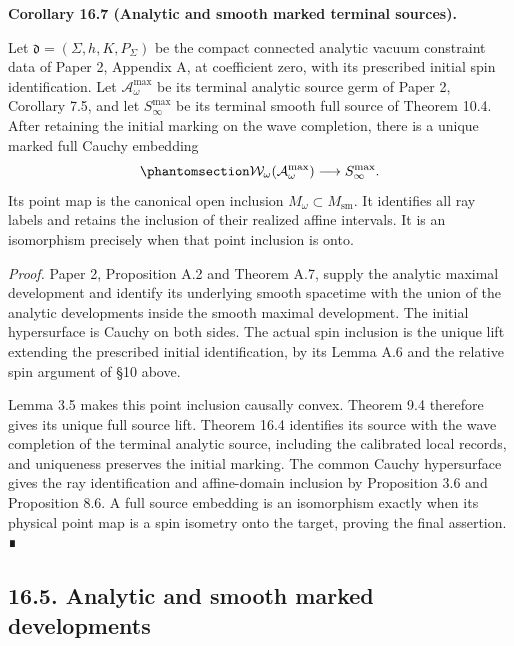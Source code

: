 \documentclass[
  english,
  11pt,
  reqno]{amsart}
\makeatletter
\newcommand{\pandocstatementheading}[1]{%
  \par\if@nobreak\else
    \addpenalty{\@beginparpenalty}%
    \addvspace{.5\baselineskip plus .2\baselineskip minus .2\baselineskip}%
  \fi
  {\normalfont\bfseries #1\par}%
  \nobreak\@afterindenttrue\@afterheading
}
\makeatother
\begin{document}
\pandocstatementheading{\protect{}\label{cor:analytic-smooth-terminal-source-inclusion}Corollary 16.7 (Analytic and smooth marked terminal sources).}

Let \(\mathfrak d=(\Sigma,h,K,P_\Sigma)\) be the compact connected
analytic vacuum constraint data of Paper 2, Appendix A, at coefficient
zero, with its prescribed initial spin identification. Let
\(\mathcal A^{\max}_\omega\) be its terminal analytic source germ of
Paper 2, Corollary 7.5, and let \(S^{\max}_\infty\) be its terminal
smooth full source of Theorem 10.4. After retaining the initial marking
on the wave completion, there is a unique marked full Cauchy embedding
\begin{equation}\protect\phantomsection\label{eq:analytic-smooth-terminal-full-embedding}{
\mathcal W_\omega(\mathcal A^{\max}_\omega)
\longrightarrow S^{\max}_\infty.
}\end{equation} Its point map is the canonical open inclusion
\(M_\omega\subset M_{\mathrm{sm}}\). It identifies all ray labels and
retains the inclusion of their realized affine intervals. It is an
isomorphism precisely when that point inclusion is onto.

\emph{Proof.} Paper 2, Proposition A.2 and Theorem A.7, supply the
analytic maximal development and identify its underlying smooth
spacetime with the union of the analytic developments inside the smooth
maximal development. The initial hypersurface is Cauchy on both sides.
The actual spin inclusion is the unique lift extending the prescribed
initial identification, by its Lemma A.6 and the relative spin argument
of §10 above.

Lemma 3.5 makes this point inclusion causally convex. Theorem 9.4
therefore gives its unique full source lift. Theorem 16.4 identifies its
source with the wave completion of the terminal analytic source,
including the calibrated local records, and uniqueness preserves the
initial marking. The common Cauchy hypersurface gives the ray
identification and affine-domain inclusion by Proposition 3.6 and
Proposition 8.6. A full source embedding is an isomorphism exactly when
its physical point map is a spin isometry onto the target, proving the
final assertion. ∎

\protect{}\label{sec:analytic-smooth-marked-development-equivalence}

\subsection{16.5. Analytic and smooth marked
developments}\label{analytic-and-smooth-marked-developments}
\end{document}
